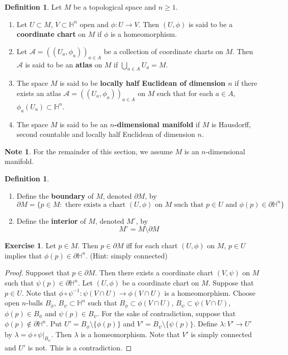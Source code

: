\documentclass[12pt]{amsart}
\theoremstyle{definition}
\newtheorem{defn}[definition]{Definition}
\newtheorem{note}[definition]{Note}
\theoremstyle{definition}
\newtheorem{ex}[definition]{Exercise}
\newcommand{\lam}{\lambda}
\renewcommand{\H}{\mathbb{H}}
\newcommand{\MA}{\mathcal{A}}
\begin{document}
	\begin{defn}
		Let $M$ be a topological space and $n \geq 1$.
		\begin{enumerate}
			\item Let $U \subset M$, $V \subset \H^n$ open and $\phi:U \rightarrow V$. Then $(U, \phi)$ is said to be a \textbf{coordinate chart} on $M$ if $\phi$ is a homeomorphism. 
			\item Let $\MA = ((U_a,\phi_{a}))_{a \in A}$ be a collection of coordinate charts on $M$. Then $\MA$ is said to be an \textbf{atlas} on $M$ if  $\bigcup\limits_{a \in A} U_a = M$.
			\item The space $M$ is said to be \textbf{locally half Euclidean of dimension $n$} if there exists an atlas $\MA = ((U_a,\phi_{a}))_{a \in A}$ on $M$ such that for each $a \in A$, $\phi_a(U_a) \subset \H^n$.
			\item The space $M$ is said to be an \textbf{$n$-dimensional manifold} if $M$ is Hausdorff, second countable and locally half Euclidean of dimension $n$. 
		\end{enumerate}
	\end{defn}

	\begin{note}
		For the remainder of this section, we assume $M$ is an $n$-dimensional manifold.
	\end{note}

	\begin{defn}\
		\begin{enumerate}
			\item Define the 
			\textbf{boundary} of $M$, denoted $\partial M$, by $$\partial M = \{p \in M: \text{ there exists a chart } (U, \phi) \text{ on } M \text{ such that } p \in U \text{ and } \phi(p) \in \partial \H^n\}$$
			\item Define the 
			\textbf{interior} of $M$, denoted $M^{\circ}$, by $$M^{\circ} = M \setminus \partial M$$
		\end{enumerate}
	\end{defn}

	\begin{ex}
		Let $p \in M$. Then $p \in \partial M$ iff for each chart $(U, \phi)$ on $M$, $p \in U$ implies that $\phi(p) \in \partial \H^n$. (Hint: simply connected)
	\end{ex}

	\begin{proof}
		Supposet that $p \in \partial M$. Then there exists a coordinate chart $(V, \psi)$ on $M$ such that $\psi(p) \in \partial \H^n$. Let $(U, \phi)$ be a coordinate chart on $M$. Suppose that $p \in U$. Note that $\phi \circ \psi^{-1} : \psi(V \cap U) \rightarrow \phi(V \cap U)$ is a homeomorphism. Choose open $n$-balls $B_{\phi}$, $B_{\psi} \subset \H^n$ such that $B_{\phi} \subset \phi(V \cap U)$, $B_{\psi} \subset \psi(V \cap U)$, $\phi(p) \in B_{\phi}$ and $\psi(p) \in B_{\psi}$. For the sake of contradiction, suppose that $\phi(p) \not \in \partial \H^n$. Put $ U' = B_{\phi} \setminus \{\phi(p)\}$ and $V' = B_{\psi} \setminus \{\psi(p)\}$. Define $\lam: V' \rightarrow U'$ by $\lam = \phi \circ \psi|_{B_{\psi}}$. Then $\lam$ is a homeomorphism. Note that $V'$ is simply connected and $U'$ is not. This is a contradiction. 
	\end{proof}
\end{document}
